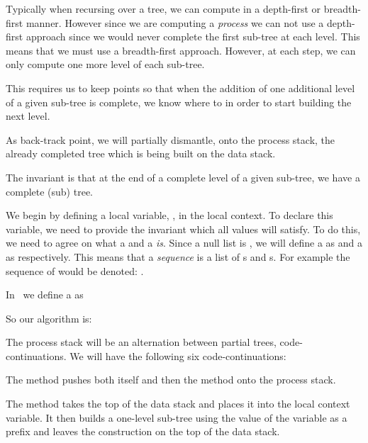 Typically when recursing over a tree, we can compute in a depth-first or 
breadth-first manner. However since we are computing a \emph{process} we 
can not use a depth-first approach since we would never complete the first 
sub-tree at each level. This means that we must use a breadth-first 
approach. However, at each step, we can only compute one more level of 
each sub-tree. 

This requires us to keep  points so that when the 
addition of one additional level of a given sub-tree is complete, we know 
where to  in order to start building the next level. 

As back-track point, we will partially dismantle, onto the process stack, 
the already completed tree which is being built on the data stack. 

The invariant is that at the end of a complete level of a given sub-tree, 
we have a complete (sub) tree. 

We begin by defining a local variable, , in the local context. 
To declare this variable, we need to provide the invariant which all 
values will satisfy. To do this, we need to agree on what a  
and a  \emph{is}. Since a null list is \type{()}, we will 
define a  as \type{(())} and a  as \type{(()())} 
respectively. This means that a  \emph{sequence} is a list 
of s and s. For example the sequence of 
 would be denoted: \type{( (()) (()()) (()) (()()) (()()) 
(()) )}. 

In \joylol\ we define a  as 

\starttyping
\startJoylolCode

\stopJoylolCode
\stoptyping

So our algorithm is:

The process stack will be an alternation between partial trees, 
code-continuations. We will have the following six code-continuations:

\startitemize

\item The  method pushes both itself and then the 
 method onto the process stack. 

\item The  method takes the top of the data stack and 
places it into the  local context variable. It then builds a 
one-level sub-tree using the value of the  variable as a prefix 
and leaves the construction on the top of the data stack. 

